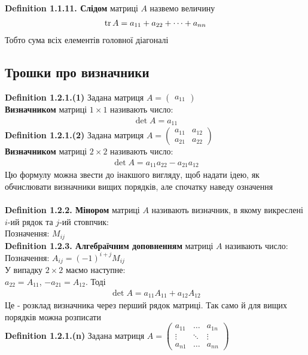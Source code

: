 \documentclass[a4paper, 14pt]{extarticle}
\def\defin#1{\textbf{Definition {#1}}}
\def\bigline{\vspace{5mm}\\}
\begin{document}
  \bigline
  \defin{1.1.11. Слідом} матриці $A$ назвемо величину
  \begin{align*}
  \tr A = a_{11} + a_{22} + \dots + a_{nn}
  \end{align*}
  Тобто сума всіх елементів головної діагоналі\\
  	\subsection{Трошки про визначники}
	\defin{1.2.1.(1)} Задана матриця $A = \begin{pmatrix} a_{11} \end{pmatrix}$\\
	\textbf{Визначником} матриці $1 \times 1$ називають число:
	\begin{align*}
	\det A = a_{11}
	\end{align*}
	\defin{1.2.1.(2)} Задана матриця $A = \begin{pmatrix}
	a_{11} & a_{12} \\
	a_{21} & a_{22}
	\end{pmatrix}$\\
	\textbf{Визначником} матриці $2 \times 2$ називають число:
	\begin{align*}
	\det A = a_{11}a_{22} - a_{21}a_{12}
	\end{align*}
	Цю формулу можна звести до інакшого вигляду, щоб надати ідею, як обчислювати визначники вищих порядків, але спочатку наведу означення\\
	\bigline
	\defin{1.2.2. Мінором} матриці $A$ називають визначник, в якому викреслені $i$-ий рядок та $j$-ий стовпчик:\\
	Позначення: $M_{ij}$\bigline
	\defin{1.2.3. Алгебраїчним доповненням} матриці $A$ називають число:\\
	Позначення: $A_{ij} = (-1)^{i+j} M_{ij}$\bigline
	У випадку $2 \times 2$ маємо наступне: \\
	$a_{22} = A_{11}$, $-a_{21} = A_{12}$. Тоді
	\begin{align*}
	\det A = a_{11}A_{11} + a_{12}A_{12}
	\end{align*}
	Це - розклад визначника через перший рядок матриці. Так само й для вищих порядків можна розписати\\
	\defin{1.2.1.(n)} Задана матриця $A = \begin{pmatrix}
	a_{11} & \dots & a_{1n} \\
	\vdots & \ddots & \vdots \\
	a_{n1} & \dots & a_{nn}
	\end{pmatrix}$\\
\end{document}
